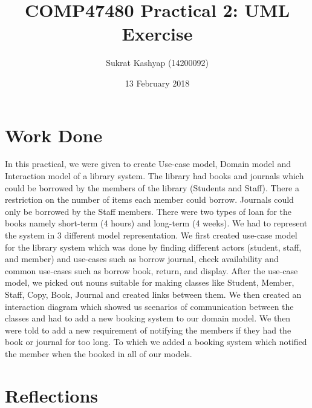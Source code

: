 \documentclass[12pt]{article}
\title{\vspace{-3.0cm}COMP47480 Practical 2: UML Exercise}
\author{Sukrat Kashyap (14200092)}
\date{13 February 2018}
\begin{document}
\maketitle

\section{Work Done}

In this practical, we were given to create Use-case model, Domain model and Interaction model of a library system. The library had books and journals which could be borrowed by the members of the library (Students and Staff). There a restriction on the number of items each member could borrow. Journals could only be borrowed by the Staff members. There were two types of loan for the books namely short-term (4 hours) and long-term (4 weeks). We had to represent the system in 3 different model representation. We first created use-case model for the library system which was done by finding different actors (student, staff, and member) and use-cases such as borrow journal, check availability and common use-cases such as borrow book, return, and display. After the use-case model, we picked out nouns suitable for making classes like Student, Member, Staff, Copy, Book, Journal and created links between them. We then created an interaction diagram which showed us scenarios of communication between the classes and had to add a new booking system to our domain model. We then were told to add a new requirement of notifying the members if they had the book or journal for too long. To which we added a booking system which notified the member when the booked in all of our models.

\section{Reflections}
\end{document}
